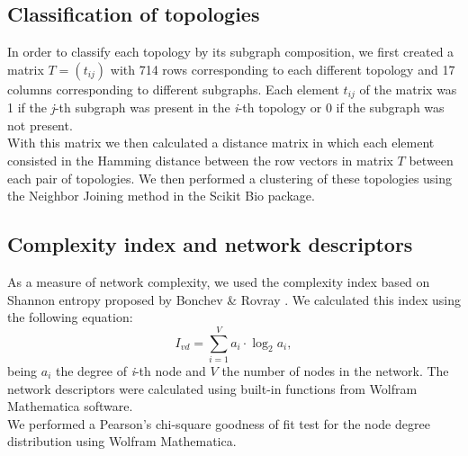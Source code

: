 \documentclass[10pt,letterpaper]{article}
\begin{document}
\subsection*{Classification of topologies}

In order to classify each topology by its subgraph composition, we first created
a matrix  $T = (t_{ij})$ with 714 rows corresponding to each different topology 
and 17 columns corresponding to different subgraphs. Each element $t_{ij}$ of 
the matrix was 1 if the \emph{j}-th subgraph was present in the \emph{i}-th 
topology or 0 if the subgraph was not present.\\

With this matrix we then calculated a distance matrix in which each element 
consisted in the Hamming distance between the row vectors in matrix $T$ between 
each pair of topologies. We then performed a clustering of these topologies 
using the Neighbor Joining method in the Scikit Bio package.

\subsection*{Complexity index and network descriptors}

As a measure of network complexity, we used the complexity index based on 
Shannon entropy proposed by Bonchev \& Rovray \cite{D.2005}. We calculated this 
index using the following equation:
\begin{equation}
 I_{vd} = \sum_{i=1}^V a_i \cdot \log_{2} a_i,
\end{equation}
\noindent
being $a_i$ the degree of \emph{i}-th node and $V$ the number of nodes in the 
network. The network descriptors were calculated using built-in functions from 
Wolfram Mathematica software.\\

We performed a Pearson’s chi-square goodness of fit test for the node degree 
distribution using Wolfram Mathematica.


\end{document}
